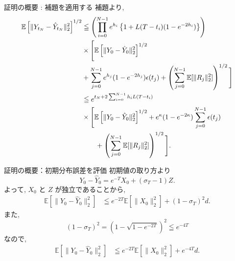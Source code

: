 \documentclass[11pt]{beamer}
\theoremstyle{plain}
\theoremstyle{definition}
\newcommand{\E}{\mathbb{E}}
\begin{document}
    \begin{frame}{証明の概要 : 補題を適用する}
      補題より, 
      {\small
      \begin{align}
        \E\left[\|Y_{t_N}-\hat{Y}_{t_N}\|_2^2\right]^{1/2}
        &\leqq
        \left(
            \prod_{i=0}^{N-1}
            e^{h_i}
            \left\{
                1+L(T-t_i)(1-e^{-2h_i})
            \right\}
        \right)\notag\\
        &\times
        \Bigg[
            \E\left[\|Y_0-\hat{Y}_0\|_2^2\right]^{1/2}\notag\\
            &
            +\sum_{j=0}^{N-1}
            e^{h_j}(1-e^{-2h_j})\epsilon(t_j)
            +\left(
                \sum_{j=0}^{N-1}\E[\|R_j\|_2^2]
            \right)^{1/2}
        \Bigg]\notag\\
        &\leqq
        e^{t_N+2\sum_{i=0}^{N-1}h_iL(T-t_i)}\notag\\
        &\times
        \Bigg[
            \E\left[\|Y_0-\hat{Y}_0\|_2^2\right]^{1/2}
            +e^{\kappa}(1-e^{-2\kappa})\sum_{j=0}^{N-1}
            \epsilon(t_j)\notag\\
        &\quad\quad
            +\left(
                \sum_{j=0}^{N-1}\E[\|R_j\|_2^2]
            \right)^{1/2}
        \Bigg].
      \end{align}
      }
    \end{frame}

    \begin{frame}{証明の概要：初期分布誤差を評価}
      初期値の取り方より
      \begin{equation}
        Y_0-\hat{Y}_0
        =e^{-T}X_0+(\sigma_T-1)Z.
      \end{equation}
      よって, $X_0$ と $Z$ が独立であることから,
      \begin{align}
        \E\left[\|Y_0-\hat{Y}_0\|_2^2\right]
        &\leqq
        e^{-2T}\E\left[\|X_0\|_2^2\right]
        +(1-\sigma_T)^2d.
      \end{align}
      また,
      \begin{equation}
        (1-\sigma_T)^2
        =
        \left(1-\sqrt{1-e^{-2T}}\right)^2
        \leqq e^{-4T}
      \end{equation}
      なので, 
      \begin{align}
        \E\left[\|Y_0-\hat{Y}_0\|_2^2\right]
        &\leqq
        e^{-2T}\E\left[\|X_0\|_2^2\right]
        +e^{-4T}d.
      \end{align}
    \end{frame}
\end{document}
